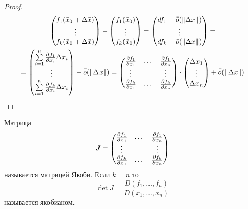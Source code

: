 \begin{proof}
    \begin{multline*}
        \begin{pmatrix}
            f_1(\bar{x}_0+\Delta \bar{x})\\
            \vdots\\
            f_k(\bar{x}_0+\Delta \bar{x})
        \end{pmatrix}
        -\begin{pmatrix}
            f_1(\bar{x}_0)\\
            \vdots\\
            f_k(\bar{x}_0)
        \end{pmatrix}
        =\begin{pmatrix}
            df_1+\bar{\bar{o}}{(\|\Delta x\|)}\\
            \vdots\\
            df_k+\bar{\bar{o}}{(\|\Delta x\|)}
        \end{pmatrix}=
        \\=\begin{pmatrix}
            \sum\limits_{i=1}^{n}\frac{\partial {f_1}}{\partial {x_i}}\Delta x_i\\
            \vdots\\
            \sum\limits_{i=1}^{n}\frac{\partial {f_k}}{\partial {x_i}}\Delta x_i
        \end{pmatrix}-\bar{\bar{o}}{(\|\Delta x\|)}=
        \begin{pmatrix}
            \frac{\partial {f_1}}{\partial {x_1}} & \dots & \frac{\partial {f_1}}{\partial {x_n}}\\
            \vdots & \null & \vdots\\
            \frac{\partial {f_k}}{\partial {x_1}} & \dots & \frac{\partial {f_k}}{\partial {x_n}}
        \end{pmatrix}
        \cdot 
        \begin{pmatrix}
            \Delta x_1\\
            \vdots\\
            \Delta x_n
        \end{pmatrix}    
        +\bar{\bar{o}}{(\|\Delta x\|)}    
    \end{multline*} 
\end{proof} 
    \begin{definition}
        Матрица
        \[J=\begin{pmatrix}
            \frac{\partial {f_1}}{\partial {x_1}} & \dots & \frac{\partial {f_1}}{\partial {x_n}}\\
            \vdots & \null & \vdots\\
            \frac{\partial {f_k}}{\partial {x_1}} & \dots & \frac{\partial {f_k}}{\partial {x_n}}
        \end{pmatrix}\]
        называется матрицей Якоби. Если $k=n$ то 
        \[\det{J}=\frac{D(f_1,\dots,f_n)}{D(x_1,\dots,x_n)}\]
        называется якобианом.
    \end{definition} 
